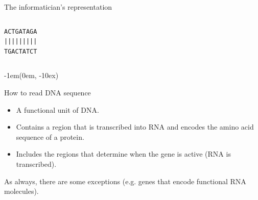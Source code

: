 \documentclass[pdf]{beamer}
\newcommand\subHeading[1]{
  \par\bigskip {\Large\bfseries#1}\par\smallskip
}
\begin{document}


\begin{frame}[fragile]{The informatician's representation}
  \begin{columns}
    \begin{column}{0.5\textwidth}
       \begin{verbatim}
ACTGATAGA
|||||||||
TGACTATCT
       \end{verbatim}
    \end{column}
    \begin{column}{0.5\textwidth}
    \end{column}
  \end{columns}
  \begin{textblock*}{\textwidth-1em}(0em, \textheight-10ex)
    \raggedleft
  \end{textblock*}  
\end{frame}

\begin{frame}{How to read DNA sequence}
\subHeading{The Gene}
\begin{itemize}
  \item A functional unit of DNA.
  \item Contains a region that is transcribed into RNA
    and encodes the amino acid sequence of a protein.
  \item Includes the regions that determine when the
    gene is active (RNA is transcribed).
\end{itemize}
As always, there are some exceptions (e.g. genes that encode
functional RNA molecules).
\end{frame}
\end{document}
